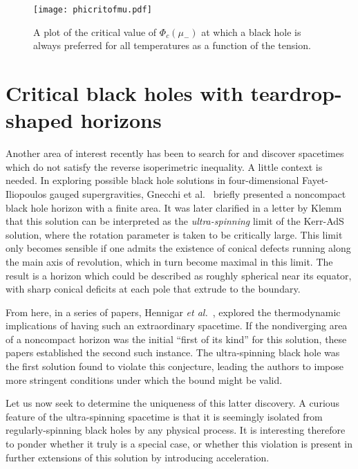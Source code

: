 \documentclass[
twoside,
openright,
frontopenright,
]{dmathesis}
\begin{document}
\begin{figure} 
  \centering
  \texttt{[image: phicritofmu.pdf]}
  \caption{\label{fig:phicrit}A plot of the critical value of $\Phi_c(\mu_-)$ at
    which a black hole is always preferred for all temperatures as a function of
    the tension.}
\end{figure}


\section{Critical black holes with teardrop-shaped horizons}
\label{chap:crit-bh}

Another area of interest recently has been to search for and discover spacetimes
which do not satisfy the reverse isoperimetric inequality. A little context is
needed. In exploring possible black hole solutions in four-dimensional
Fayet-Iliopoulos gauged supergravities, Gnecchi et al.~\cite{Gnecchi:2013mja}
briefly presented a noncompact black hole horizon with a finite area. It was
later clarified in a letter by Klemm~\cite{Klemm:2014rda} that this solution can
be interpreted as the \emph{ultra-spinning} limit of the Kerr-AdS solution,
where the rotation parameter is taken to be critically large. This limit only
becomes sensible if one admits the existence of conical defects running along
the main axis of revolution, which in turn become maximal in this limit. The
result is a horizon which could be described as roughly spherical near its
equator, with sharp conical deficits at each pole that extrude to the boundary.

From here, in a series of papers, Hennigar \emph{et
  al.}~\cite{Hennigar:2015gan,Hennigar:2014cfa,Hennigar:2015cja}, explored the
thermodynamic implications of having such an extraordinary spacetime. If the
nondiverging area of a noncompact horizon was the initial ``first of its kind''
for this solution, these papers established the second such instance. The
ultra-spinning black hole was the first solution found to violate this
conjecture, leading the authors to impose more stringent conditions under which
the bound might be valid.

Let us now seek to determine the uniqueness of this latter discovery. A curious
feature of the ultra-spinning spacetime is that it is seemingly isolated from
regularly-spinning black holes by any physical process. It is interesting
therefore to ponder whether it truly is a special case, or whether this
violation is present in further extensions of this solution by introducing
acceleration.
\end{document}
